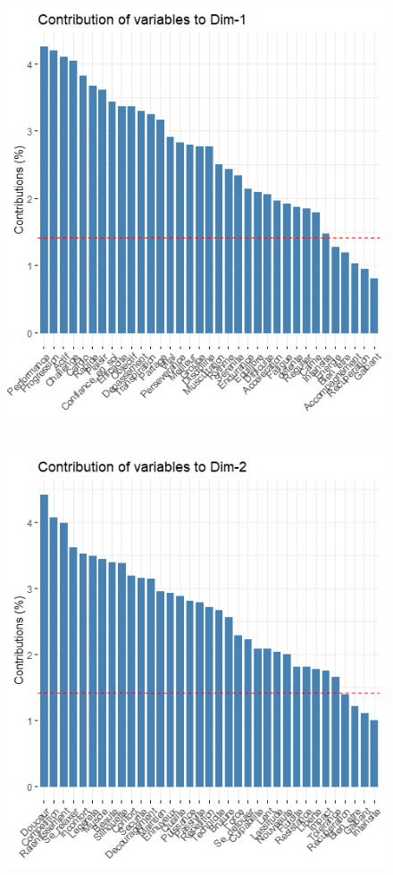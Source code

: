 \documentclass[12pt]{article}
\begin{document}
\begin{figure}[H]
\begin{center}
\includegraphics[scale=1.3]{ACP_2.png} 
\caption[]{\ }
\end{center}
\end{figure}


\begin{figure}[H]
\begin{center}
\includegraphics[scale=1.3]{ACP_3.png} 
\caption[]{\ }
\end{center}
\end{figure}
\end{document}
